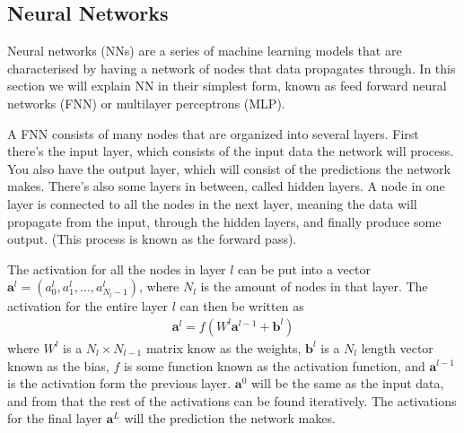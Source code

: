 



\subsection{Neural Networks}

Neural networks (NNs) are a series of machine learning models that are characterised by having a network of nodes that data propagates through. 
In this section we will explain NN in their simplest form, known as feed forward neural networks (FNN) or multilayer perceptrons (MLP). 

A FNN consists of many nodes that are organized into several layers. First there's the input layer, which consists of the input data the network will process. You also have the output layer, which will consist of the predictions the network makes. There's also some layers in between, called hidden layers. A node in one layer is connected to all the nodes in the next layer, meaning the data will propagate from the input, through the hidden layers, and finally produce some output. 
(This process is known as the forward pass).

The activation for all the nodes in layer $l$ can be put into a vector $\mathbf{a}^l = (a^l_{0}, a^l_1, ..., a^{l}_{N_l-1})$, where $N_l$ is the amount of nodes in that layer. %
The activation for the entire layer $l$ can then be written as
\begin{align}
	\mathbf{a}^l = f(W^l \mathbf{a}^{l-1} + \mathbf{b}^{l}) 
\end{align}
where $W^l$ is a $N_l \times N_{l-1}$ matrix know as the weights, $\mathbf{b}^{l}$ is a $N_l$ length vector known as the bias, $f$ is some function known as the activation function, and $\mathbf{a}^{l-1}$ is the activation form the previous layer. $\mathbf{a}^{0}$ will be the same as the input data, and from that the rest of the activations can be found iteratively. The activations for the final layer $\mathbf{a}^L$ will the prediction the network makes.

